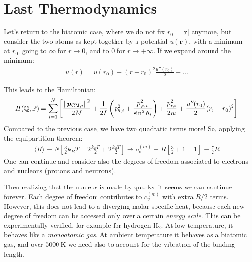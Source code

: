 \documentclass[../../main.tex]{subfiles}
\begin{document}


\section{Last Thermodynamics}
Let's return to the biatomic case, where we do not fix $r_0 = |\bm{r}|$ anymore, but consider the two atoms as kept together by a potential $u(\bm{r})$, with a minimum at $r_0$, going to $\infty$ for $r \to 0$, and to $0$ for $r \to +\infty$. If we expand around the minimum:
\begin{align*}
    u(r) = u(r_0) + (r-r_0)^2 \frac{u''(r_0)}{2} + \dots 
\end{align*}

This leads to the Hamiltonian:
\begin{align*}
    H(\mathbb{Q},\mathbb{P}) = \sum_{i=1}^N \left[\frac{\norm{\bm{p}_{\mathrm{CM},i}}^2}{2M} + \frac{1}{2I} \left(p_{\theta,i}^2 + \frac{p_{\varphi,i}^2}{\sin^2 \theta_i} \right)  + \frac{p_{r,i}^2}{2m} + \frac{u''(r_0)}{2} (r_i-r_0)^2   \right]
\end{align*}
Compared to the previous case, we have two quadratic terms more! So, applying the equipartition theorem:
\begin{align*}
    \langle H \rangle = N\left[\frac{3}{2} k_B T + 2 \frac{k_B T}{2} +2 \frac{k_B T}{2}   \right] \Rightarrow c_v^{(m)} = R\left[\frac{3}{2} + 1 + 1 \right] = \frac{7}{2} R 
\end{align*}
One can continue and consider also the degrees of freedom associated to electrons and nucleons (protons and neutrons).

Then realizing that the nucleus is made by quarks, it seems we can continue forever. Each degree of freedom contributes to $c_v^{(m)}$ with extra $R/2$ terms. However, this does not lead to a diverging molar specific heat, because each new degree of freedom can be accessed only over a certain \textit{energy scale}. This can be experimentally verified, for example for hydrogen H$_2$. At low temperature, it behaves like a \textit{monoatomic gas}. At ambient temperature it behaves as a biatomic gas, and over $\SI{5000}{\K}$ we need also to account for the vibration of the binding length.

\medskip
\end{document}
